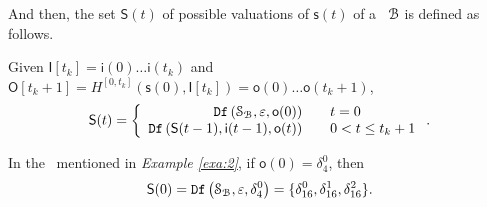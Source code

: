  And then, the set $\mathsf{S}(t)$ of possible valuations of $\mathsf{s}(t)$ of a \BCN\ ${\mathcal{B}}$ is defined as follows. 
 \begin{definition}[$\mathsf{S}(t)$] Given $\mathsf{I}[t_k]=\mathsf{i}(0)\ldots\mathsf{i}(t_k)$ and $\mathsf{O}[t_k+1]= H^{[0,t_k]}(\mathsf{s}(0),\mathsf{I}[t_k])=\mathsf{o}(0)\ldots\mathsf{o}(t_k+1)$, %
	\[\mathsf{S}(t)=\left\{
\begin{array}{rcl}
{\tt Df}\left(\mathcal{S}_{\mathcal{B}},\varepsilon,\mathsf{o}(0)\right)      &      & {t=0}\\
{\tt Df}\left(\mathsf{S}(t-1),\mathsf{i}(t-1),\mathsf{o}(t)\right)       &      & 0<t\leq t_k+1
\end{array} \right. .\]

\end{definition}
\begin{example}
In the \BCN\ mentioned in {\em Example \ref{exa:2}}, if $\mathsf{o}(0)=\delta_4^0$, then \[\mathsf{S}(0)={\tt Df}\left(\mathcal{S}_{\mathcal{B}},\varepsilon,\delta_4^0\right)=\{\delta_{16}^0,\delta_{16}^1,\delta_{16}^2\}.\]
 \label{exa:8}
 \end{example}   
 

 
 

